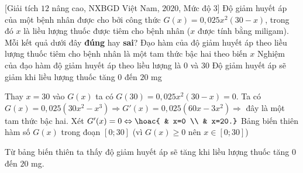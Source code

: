 \begin{ex}%
[Giải tích $12$ nâng cao, NXBGD Việt Nam, $2020$, Mức độ 3]%
%
	Độ giảm huyết áp của một bệnh nhân được cho bởi công thức $G(x)=0{,}025x^2(30-x)$, trong đó $x$ là liều lượng thuốc được tiêm cho bệnh nhân ($x$ được tính bằng miligam). Mỗi kết quả dưới đây \textbf{đúng} hay \textbf{sai}?
	{\True Đạo hàm của độ giảm huyết áp theo liều lượng thuốc tiêm cho bệnh nhân là một tam thức bậc hai theo biến $x$}
	{Nghiệm của đạo hàm độ giảm huyết áp theo liều lượng là $0$ và $30$}
	{Độ giảm huyết áp sẽ giảm khi liều lượng thuốc tăng $0$ đến $20$ mg}
	\loigiai
	{ 
		\begin{itemchoice}
			\itemch Thay $x=30$ vào $G(x)$ ta có $G(30)=0{,}025x^2(30-x)=0$.
			\itemch Ta có $G(x)=0{,}025\left(30x^2-x^3\right) \Rightarrow G'(x)=0{,}025\left(60x-3x^2\right) \Rightarrow$ đây là một tam thức bậc hai.
			\itemch Xét $G'(x)=0 \Leftrightarrow \hoac{ & x=0 \\ & x=20.}$ 
			\itemch Bảng biến thiên hàm số $G(x)$ trong đoạn $[0;30]$ (vì $G(x)\ge 0$ nên $x\in [0;30]$)
			\begin{center}
			\end{center}
			Từ bảng biến thiên ta thấy độ giảm huyết áp sẽ tăng khi liều lượng thuốc tăng $0$ đến $20$ mg.
		\end{itemchoice}
	}
\end{ex}

